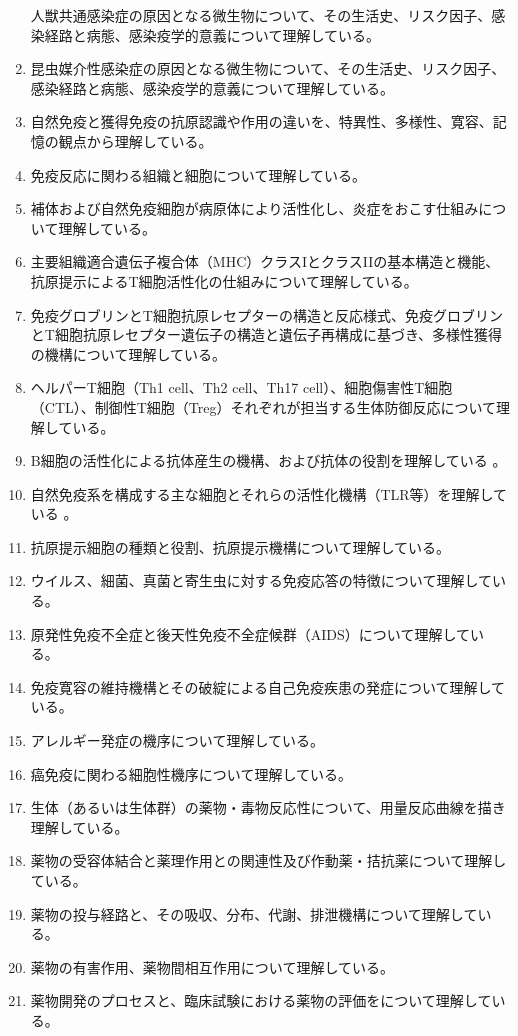 \begin{enumerate}
  人獣共通感染症の原因となる微生物について、その生活史、リスク因子、感染経路と病態、感染疫学的意義について理解している。
\item
  昆虫媒介性感染症の原因となる微生物について、その生活史、リスク因子、感染経路と病態、感染疫学的意義について理解している。
\item
  自然免疫と獲得免疫の抗原認識や作用の違いを、特異性、多様性、寛容、記憶の観点から理解している。
\item
  免疫反応に関わる組織と細胞について理解している。
\item
  補体および自然免疫細胞が病原体により活性化し、炎症をおこす仕組みについて理解している。
\item
  主要組織適合遺伝子複合体（MHC）クラスIとクラスIIの基本構造と機能、抗原提示によるT細胞活性化の仕組みについて理解している。
\item
  免疫グロブリンとT細胞抗原レセプターの構造と反応様式、免疫グロブリンとT細胞抗原レセプター遺伝子の構造と遺伝子再構成に基づき、多様性獲得の機構について理解している。
\item
  ヘルパーT細胞（Th1 cell、Th2 cell、Th17
  cell）、細胞傷害性T細胞（CTL）、制御性T細胞（Treg）それぞれが担当する生体防御反応について理解している。
\item
  B細胞の活性化による抗体産生の機構、および抗体の役割を理解している 。
\item
  自然免疫系を構成する主な細胞とそれらの活性化機構（TLR等）を理解している
  。
\item
  抗原提示細胞の種類と役割、抗原提示機構について理解している。
\item
  ウイルス、細菌、真菌と寄生虫に対する免疫応答の特徴について理解している。
\item
  原発性免疫不全症と後天性免疫不全症候群（AIDS）について理解している。
\item
  免疫寛容の維持機構とその破綻による自己免疫疾患の発症について理解している。
\item
  アレルギー発症の機序について理解している。
\item
  癌免疫に関わる細胞性機序について理解している。
\item
  生体（あるいは生体群）の薬物・毒物反応性について、用量反応曲線を描き理解している。
\item
  薬物の受容体結合と薬理作用との関連性及び作動薬・拮抗薬について理解している。
\item
  薬物の投与経路と、その吸収、分布、代謝、排泄機構について理解している。
\item
  薬物の有害作用、薬物間相互作用について理解している。
\item
  薬物開発のプロセスと、臨床試験における薬物の評価をについて理解している。
\end{enumerate}

